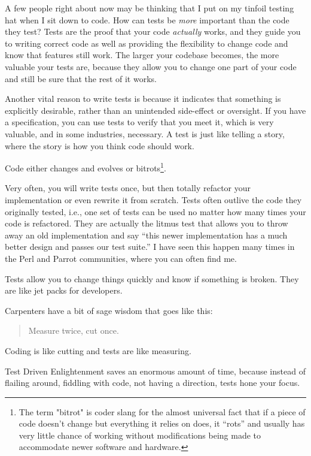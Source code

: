 A few people right about now may be thinking that I put on my tinfoil testing
hat when I sit down to code. How can tests be \emph{more} important than the
code they test? Tests are the proof that your code \emph{actually} works, and
they guide you to writing correct code as well as providing the flexibility to
change code and know that features still work. The larger your codebase becomes,
the more valuable your tests are, because they allow you to change one part of
your code and still be sure that the rest of it works.

Another vital reason to write tests is because it indicates that something is
explicitly desirable, rather than an unintended side-effect or oversight. If you
have a specification, you can use tests to verify that you meet it, which is
very valuable, and in some industries, necessary. A test is just like telling a
story, where the story is how you think code should work.

Code either changes and evolves or bitrots\footnote{The term "bitrot" is coder
slang for the almost universal fact that if a piece of code doesn't change but
everything it relies on does, it ``rots'' and usually has very little chance of
working without modifications being made to accommodate newer software and
hardware.}.

Very often, you will write tests once, but then totally refactor your
implementation or even rewrite it from scratch. Tests often outlive the code
they originally tested, i.e., one set of tests can be used no matter how many
times your code is refactored. They are actually the litmus test that allows you
to throw away an old implementation and say ``this newer implementation has a
much better design and passes our test suite.'' I have seen this happen many
times in the Perl and Parrot communities, where you can often find me.

Tests allow you to change things quickly and know if something is broken. They
are like jet packs for developers.

Carpenters have a bit of sage wisdom that goes like this:
\begin{quote}Measure twice, cut once.\end{quote} 

Coding is like cutting and tests are like measuring.

Test Driven Enlightenment saves an enormous amount of time, because instead of
flailing around, fiddling with code, not having a direction, tests hone your
focus.

